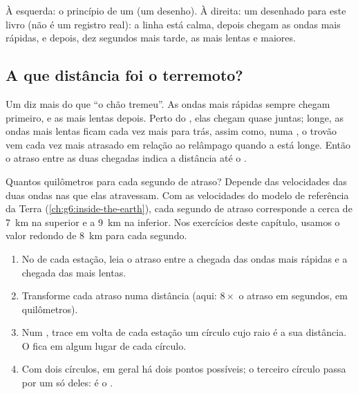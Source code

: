\begin{omfigure}
{\small À esquerda: o princípio de um  (um desenho). À direita:
um  desenhado para este livro (não é um registro real): a linha
está calma, depois chegam as ondas mais rápidas, e depois, dez segundos
mais tarde, as mais lentas e maiores.}
\label{fig:g7:earthquakes:seismometer}
\end{omfigure}

\subsection*{A que distância foi o terremoto?}

Um  diz mais do que ``o chão tremeu''. As ondas mais rápidas
sempre chegam primeiro, e as mais lentas depois. Perto do , elas
chegam quase juntas; longe, as ondas mais lentas ficam cada vez mais para
trás, assim como, numa , o trovão vem cada vez mais atrasado em
relação ao relâmpago quando a  está longe. Então o atraso entre
as duas chegadas indica a distância até o .

Quantos quilômetros para cada segundo de atraso? Depende das velocidades
das duas ondas nas  que elas atravessam. Com as velocidades do
modelo de referência da Terra (\cref{ch:g6:inside-the-earth}), cada
segundo de atraso corresponde a cerca de \qty{7}{km} na  superior e
a \qty{9}{km} na  inferior. Nos exercícios deste capítulo, usamos o
valor redondo de \qty{8}{km} para cada segundo.

\begin{method}\label{met:g7:earthquakes:three-circles}
\begin{enumerate}
  \item No  de cada estação, leia o atraso entre a chegada das
        ondas mais rápidas e a chegada das mais lentas.
  \item Transforme cada atraso numa distância (aqui: $8 \times$ o atraso
        em segundos, em quilômetros).
  \item Num , trace em volta de cada estação um círculo cujo raio é a
        sua distância. O  fica em algum lugar de cada círculo.
  \item Com dois círculos, em geral há dois pontos possíveis; o terceiro
        círculo passa por um só deles: é o .
\end{enumerate}
\end{method}

